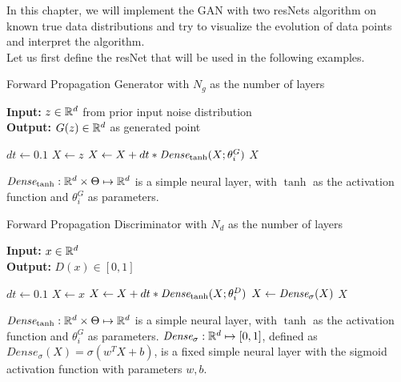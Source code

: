In this chapter, we will implement the GAN with two resNets algorithm on known true data distributions and try to visualize the evolution of data points and interpret the algorithm.\\
Let us first define the resNet that will be used in the following examples.
\begin{algorithm}
\caption{Forward Propagation Generator with $N_g$ as the number of layers}\label{alg:gen}
\textbf{Input: } $z \in \mathbb{R} ^{d}$ from prior input noise distribution\\
\textbf{Output: } $G(z) \in \mathbb{R}^{d}$ as generated point
\begin{algorithmic}
\State $dt \gets 0.1$
\State $X \gets z$
\State $X \gets X + dt * \textit{Dense}_{\tanh} (X; \theta_i^G) $
\EndFor
\State \Return $X$
\end{algorithmic}
$\textit{Dense}_{\tanh} : \mathbb{R}^{d} \times \Theta \mapsto \mathbb{R}^{d}$ is a simple neural layer, with $\tanh $ as the activation function and $\theta_i^G$ as parameters.
\end{algorithm}

\begin{algorithm}
\caption{Forward Propagation Discriminator with $N_d$ as the number of layers}\label{alg:disc}
\textbf{Input: } $x \in \mathbb{R} ^{d}$ \\
\textbf{Output: } $D(x) \in [0,1]$
\begin{algorithmic}
\State $dt \gets 0.1$
\State $X \gets x$
\State $X \gets X + dt * \textit{Dense}_{\tanh} (X; \theta_i^D) $
\EndFor
\State $X \gets \textit{Dense}_{\sigma} (X)$
\State \Return $X$
\end{algorithmic}
$\textit{Dense}_{\tanh} : \mathbb{R}^{d} \times \Theta \mapsto \mathbb{R}^{d}$ is a simple neural layer, with $\tanh $ as the activation function and $\theta_i^G$ as parameters. $\textit{Dense}_{\sigma}: \mathbb{R}^d \mapsto [0,1]$, defined as $Dense_{\sigma}(X) = \sigma(w^TX+b) $, is a fixed simple neural layer with the sigmoid activation function with parameters $w, b$.
\end{algorithm}

